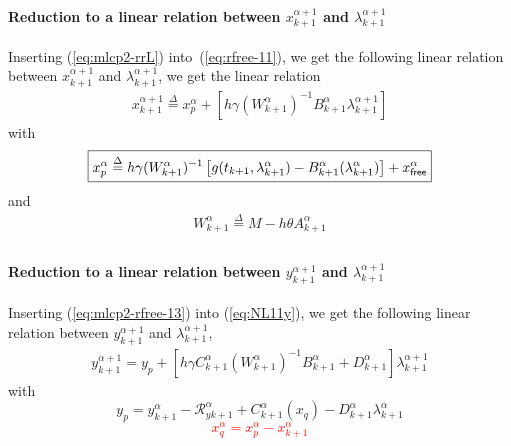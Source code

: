 \paragraph{Reduction to a linear relation between  $x^{\alpha+1}_{k+1}$ and
$\lambda^{\alpha+1}_{k+1}$}

Inserting (\ref{eq:mlcp2-rrL}) into~(\ref{eq:rfree-11}), we get the following linear relation between $x^{\alpha+1}_{k+1}$ and
$\lambda^{\alpha+1}_{k+1}$, we get the linear relation
\begin{equation}
  \label{eq:mlcp2-rfree-13}
  \begin{array}{l}
 \boxed{   x^{\alpha+1}_{k+1}\stackrel{\Delta}{=} x^\alpha_p + \left[ h \gamma (W^{\alpha}_{k+1})^{-1}    B^{\alpha}_{k+1} \lambda^{\alpha+1}_{k+1}\right]}
   \end{array}
\end{equation}
with 
\begin{equation}
  \boxed{x^\alpha_p \stackrel{\Delta}{=}  h\gamma(W^{\alpha}_{k+1} )^{-1}\left[g(t_{k+1},\lambda^{\alpha}_{k+1}) 
    -B^{\alpha}_{k+1} (\lambda^{\alpha}_{k+1}) \right ] +x^\alpha_{{\sf free}}}
\end{equation}
and
\begin{equation}
  \label{eq:mlcp2-NL9}
  \begin{array}{l}
    W^{\alpha}_{k+1} \stackrel{\Delta}{=} M-h\theta A^{\alpha}_{k+1}\\
  \end{array}
\end{equation}


\paragraph{Reduction to a linear relation between  $y^{\alpha+1}_{k+1}$ and
$\lambda^{\alpha+1}_{k+1}$}

Inserting (\ref{eq:mlcp2-rfree-13}) into (\ref{eq:NL11y}), we get the following linear relation between $y^{\alpha+1}_{k+1}$ and $\lambda^{\alpha+1}_{k+1}$, 
\begin{equation}
   \begin{array}{l}
 y^{\alpha+1}_{k+1} = y_p + \left[ h \gamma C^{\alpha}_{k+1} ( W^{\alpha}_{k+1})^{-1}  B^{\alpha}_{k+1} + D^{\alpha}_{k+1} \right]\lambda^{\alpha+1}_{k+1}
   \end{array}
\end{equation}
with 
\begin{equation}\boxed{
y_p = y^{\alpha}_{k+1} -\mathcal R^{\alpha}_{yk+1} + C^{\alpha}_{k+1}(x_q) -
D^{\alpha}_{k+1} \lambda^{\alpha}_{k+1} }
\end{equation}
\textcolor{red}{
  \begin{equation}
    \boxed{ x^\alpha_q= x^\alpha_p - x^{\alpha}_{k+1}\label{eq:mlcp2-xqq}}
  \end{equation}
}

